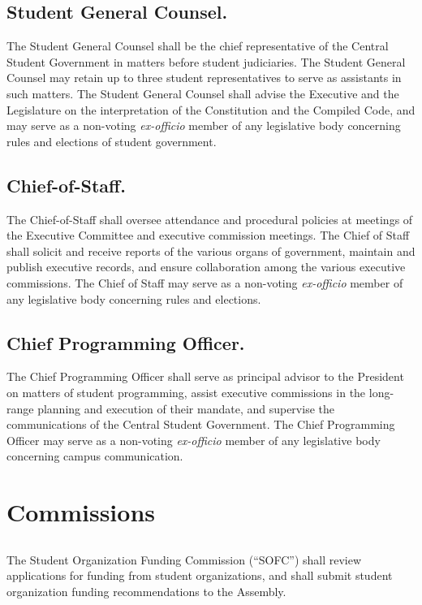 \subsection{Student General Counsel.}
The Student General Counsel shall be the chief representative of the Central Student Government in matters before student judiciaries. The Student General Counsel may retain up to three student representatives to serve as assistants in such matters. The Student General Counsel shall advise the Executive and the Legislature on the interpretation of the Constitution and the Compiled Code, and may serve as a non-voting \textit{ex-officio} member of any legislative body concerning rules and elections of student government.

\subsection{Chief-of-Staff.}
The Chief-of-Staff shall oversee attendance and procedural policies at meetings of the Executive Committee and executive commission meetings. The Chief of Staff shall solicit and receive reports of the various organs of government, maintain and publish executive records, and ensure collaboration among the various executive commissions. The Chief of Staff may serve as a non-voting \textit{ex-officio} member of any legislative body concerning rules and elections.

\subsection{Chief Programming Officer.}
The Chief Programming Officer shall serve as principal advisor to the President on matters of student programming, assist executive commissions in the long-range planning and execution of their mandate, and supervise the communications of the Central Student Government. The Chief Programming Officer may serve as a non-voting \textit{ex-officio} member of any legislative body concerning campus communication.

\section{Commissions}

\subsection{}
The Student Organization Funding Commission (``SOFC'') shall review applications for funding from student organizations, and shall submit student organization funding recommendations to the Assembly.

